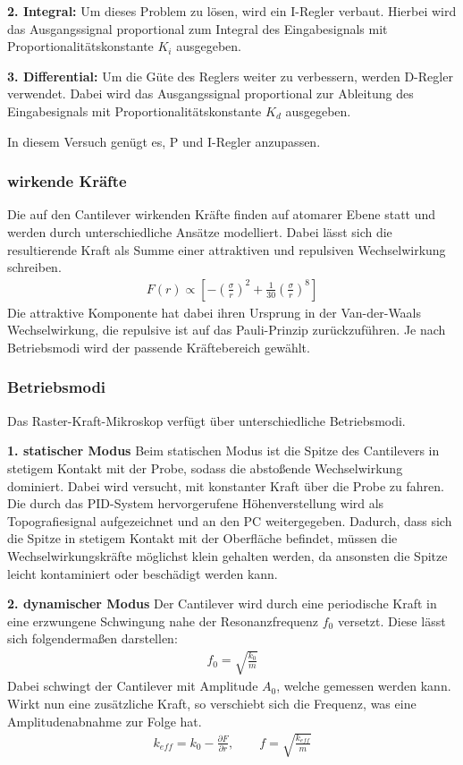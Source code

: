 \textbf{2. Integral:}
Um dieses Problem zu lösen, wird ein I-Regler verbaut.
Hierbei wird das Ausgangssignal proportional zum Integral des Eingabesignals mit Proportionalitätskonstante $K_i$ ausgegeben.

\textbf{3. Differential:}
Um die Güte des Reglers weiter zu verbessern, werden D-Regler verwendet.
Dabei wird das Ausgangssignal proportional zur Ableitung des Eingabesignals mit Proportionalitätskonstante $K_d$ ausgegeben.

In diesem Versuch genügt es, P und I-Regler anzupassen.


\subsubsection{wirkende Kräfte}
Die auf den Cantilever wirkenden Kräfte finden auf atomarer Ebene statt und werden durch unterschiedliche Ansätze modelliert.
Dabei lässt sich die resultierende Kraft als Summe einer attraktiven und repulsiven Wechselwirkung schreiben.
\begin{align*}
    F(r) \propto \left[ - \left( \frac{\sigma}{r} \right)^2 + \frac{1}{30} \left( \frac{\sigma}{r} \right)^8 \right]
\end{align*}
Die attraktive Komponente hat dabei ihren Ursprung in der Van-der-Waals Wechselwirkung, die repulsive ist auf das Pauli-Prinzip zurückzuführen.
Je nach Betriebsmodi wird der passende Kräftebereich gewählt.


\subsubsection{Betriebsmodi}
Das Raster-Kraft-Mikroskop verfügt über unterschiedliche Betriebsmodi. \vspace{\baselineskip}

\textbf{1. statischer Modus}
Beim statischen Modus ist die Spitze des Cantilevers in stetigem Kontakt mit der Probe, sodass die abstoßende Wechselwirkung dominiert.
Dabei wird versucht, mit konstanter Kraft über die Probe zu fahren.
Die durch das PID-System hervorgerufene Höhenverstellung wird als Topografiesignal aufgezeichnet und an den PC weitergegeben.
Dadurch, dass sich die Spitze in stetigem Kontakt mit der Oberfläche befindet, müssen die Wechselwirkungskräfte möglichst klein gehalten werden,
da ansonsten die Spitze leicht kontaminiert oder beschädigt werden kann.

\textbf{2. dynamischer Modus}
Der Cantilever wird durch eine periodische Kraft in eine erzwungene Schwingung nahe der Resonanzfrequenz $f_0$ versetzt.
Diese lässt sich folgendermaßen darstellen:
\begin{align*}
    f_0 = \sqrt{ \frac{k_0}{m}}
\end{align*}
Dabei schwingt der Cantilever mit Amplitude $A_0$, welche gemessen werden kann.
Wirkt nun eine zusätzliche Kraft, so verschiebt sich die Frequenz, was eine Amplitudenabnahme zur Folge hat.
\begin{align*}
    k_{eff} = k_0 - \frac{\partial F}{ \partial r}, \qquad f = \sqrt{\frac{k_{eff}}{m}}
\end{align*}


